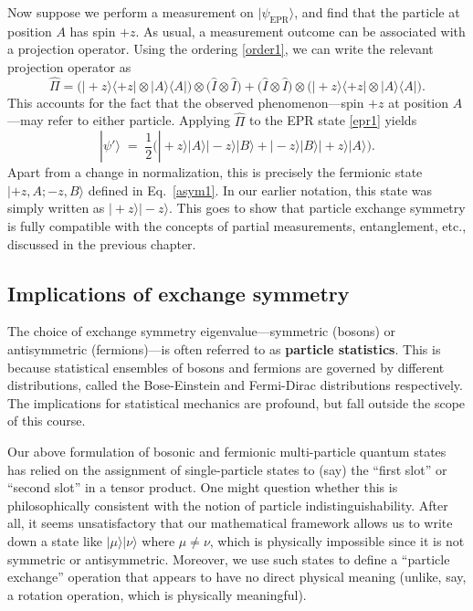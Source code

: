 \documentclass[pra,12pt]{revtex4}
\begin{document}
Now suppose we perform a measurement on $|\psi_{\mathrm{EPR}}\rangle$,
and find that the particle at position $A$ has spin $+z$.  As usual, a
measurement outcome can be associated with a projection operator.
Using the ordering \eqref{order1}, we can write the relevant
projection operator as
\begin{equation}
  \hat{\Pi} = \Big(|\!+\!z\rangle \langle+z| \otimes |A\rangle \langle A|\Big)
  \otimes\Big( \hat{I} \otimes \hat{I}\Big)
  + \Big(\hat{I} \otimes \hat{I} \Big) \otimes \Big(
  |\!+\!z\rangle \langle+z| \otimes |A\rangle \langle A| \Big).
\end{equation}
This accounts for the fact that the observed phenomenon---spin $+z$ at
position $A$---may refer to either particle.  Applying $\hat{\Pi}$ to
the EPR state \eqref{epr1} yields
\begin{equation}
  |\psi'\rangle \;=\;
  \frac{1}{2} \Big(
    |\!+\!z\rangle|A\rangle |\!-\!z\rangle|B\rangle
    + |\!-\!z\rangle|B\rangle |\!+\!z\rangle|A\rangle \Big).
\end{equation}
Apart from a change in normalization, this is precisely the fermionic
state $|+\!z,A;-z,B\rangle$ defined in Eq.~\eqref{asym1}.  In our
earlier notation, this state was simply written as
$|\!+\!z\rangle|-\!z\rangle$.  This goes to show that particle
exchange symmetry is fully compatible with the concepts of partial
measurements, entanglement, etc., discussed in the previous chapter.

\subsection{Implications of exchange symmetry}

The choice of exchange symmetry eigenvalue---symmetric (bosons) or
antisymmetric (fermions)---is often referred to as \textbf{particle
  statistics}.  This is because statistical ensembles of bosons and
fermions are governed by different distributions, called the
Bose-Einstein and Fermi-Dirac distributions respectively.  The
implications for statistical mechanics are profound, but fall outside
the scope of this course.

Our above formulation of bosonic and fermionic multi-particle quantum
states has relied on the assignment of single-particle states to (say)
the ``first slot'' or ``second slot'' in a tensor product.  One might
question whether this is philosophically consistent with the notion of
particle indistinguishability.  After all, it seems unsatisfactory
that our mathematical framework allows us to write down a state like
$|\mu\rangle|\nu\rangle$ where $\mu\ne\nu$, which is physically
impossible since it is not symmetric or antisymmetric.  Moreover, we
use such states to define a ``particle exchange'' operation that
appears to have no direct physical meaning (unlike, say, a rotation
operation, which is physically meaningful).
\end{document}
